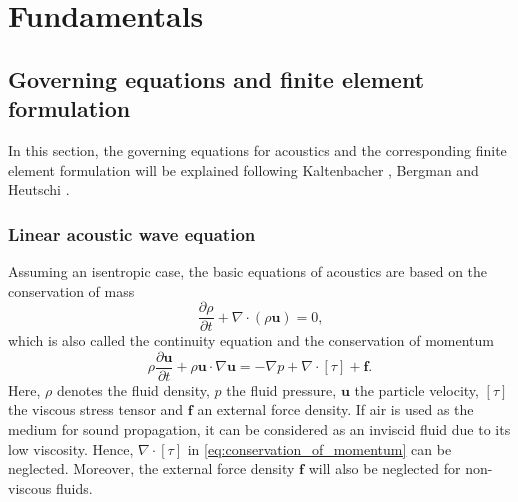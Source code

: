 \chapter{Fundamentals}
\label{chap:Theory}

\section{Governing equations and finite element formulation}

In this section, the governing equations for acoustics and the corresponding finite element formulation will be explained following Kaltenbacher \cite{kaltenbacher_numerical_2007, kaltenbacher_computational_2018}, Bergman \cite{bergman_computational_2018} and Heutschi \cite{heutschi_lecture_2016}.

\subsection*{Linear acoustic wave equation}
 Assuming an isentropic case, the basic equations of acoustics are based on the conservation of mass
\begin{equation}
	\frac{\partial \rho}{\partial t} + \nabla \cdot (\rho \boldsymbol{u}) = 0\text{,} \label{eq:conservation_of_mass}
\end{equation}
which is also called the continuity equation and the conservation of momentum
\begin{equation}
	\rho\frac{\partial \boldsymbol{u}}{\partial t} + \rho \boldsymbol{u}\cdot\nabla\boldsymbol{u} = -\nabla p + \nabla\cdot\left[\tau\right] + \boldsymbol{f}\text{.} \label{eq:conservation_of_momentum}
\end{equation}
Here, $\rho$ denotes the fluid density, $p$ the fluid pressure, $\boldsymbol{u}$ the particle velocity, $\left[\tau\right]$ the viscous stress tensor and $\boldsymbol{f}$ an external force density. If air is used as the medium for sound propagation, it can be considered as an inviscid fluid due to its low viscosity. Hence, $\nabla\cdot\left[\tau\right]$ in \cref{eq:conservation_of_momentum} can be neglected. Moreover, the external force density $\boldsymbol{f}$ will also be neglected for non-viscous fluids.

